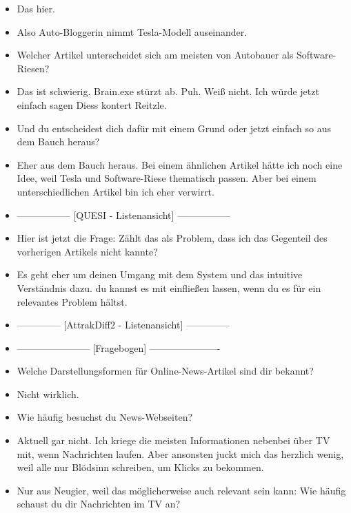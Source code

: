 {\begin{itemize}[]
            \item {} Das hier.
            \item {} Also \flqq Auto-Bloggerin nimmt Tesla-Modell auseinander\frqq{}.
            \item {} Welcher Artikel unterscheidet sich am meisten von \flqq Autobauer als Software-Riesen\frqq{}?
            \item {} Das ist schwierig.
                  Brain.exe stürzt ab.
                  Puh.
                  Weiß nicht.
                  Ich würde jetzt einfach sagen Diess kontert Reitzle.
            \item {} Und du entscheidest dich dafür mit einem Grund oder jetzt einfach so aus dem Bauch heraus?
            \item {} Eher aus dem Bauch heraus.
                  Bei einem ähnlichen Artikel hätte ich noch eine Idee, weil Tesla und Software-Riese thematisch passen.
                  Aber bei einem unterschiedlichen Artikel bin ich eher verwirrt.
            \item {-----------------} [QUESI - Listenansicht] {-----------------}
            \item {} Hier ist jetzt die Frage: Zählt das als Problem, dass ich das Gegenteil des vorherigen Artikels nicht kannte?
            \item {} Es geht eher um deinen Umgang mit dem System und das intuitive Verständnis dazu.
                  du kannst es mit einfließen lassen, wenn du es für ein relevantes Problem hältst.
            \item {--------------} [AttrakDiff2 - Listenansicht] {--------------}
            \item {-----------------------} [Fragebogen] {----------------------}
            \item {} Welche Darstellungsformen für Online-News-Artikel sind dir bekannt?
            \item {} Nicht wirklich.
            \item {} Wie häufig besuchst du News-Webseiten?
            \item {} Aktuell gar nicht.
                  Ich kriege die meisten Informationen nebenbei über TV mit, wenn Nachrichten laufen.
                  Aber ansonsten juckt mich das herzlich wenig, weil alle nur Blödsinn schreiben, um Klicks zu bekommen.
            \item {} Nur aus Neugier, weil das möglicherweise auch relevant sein kann: Wie häufig schaust du dir Nachrichten im TV an?

\end{itemize}}
